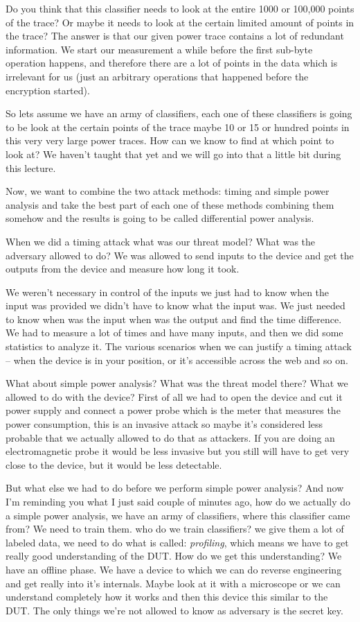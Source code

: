 Do you think that this classifier needs to look at the entire 1000 or 100,000
points of the trace? Or maybe it needs to look at the certain limited amount of
points in the trace? The answer is that our given power trace contains a lot of
redundant information. We start our measurement a while before the first
sub-byte operation happens, and therefore there are a lot of points in the data
which is irrelevant for us (just an arbitrary operations that happened before
the encryption started).

So lets assume we have an army of classifiers, each one of these classifiers is
going to be look at the certain points of the trace maybe 10 or 15 or hundred
points in this very very large power traces. How can we know to find at which
point to look at? We haven't taught that yet and we will go into that a little
bit during this lecture. 
 
Now, we want to combine the two attack methods: timing and simple power analysis
and take the best part of each one of these methods combining them somehow and
the results is going to be called differential power analysis.
 
When we did a timing attack what was our threat model? What was the adversary
allowed to do? We was allowed to send inputs to the device and get the outputs
from the device and measure how long it took.
 
We weren't necessary in control of the inputs we just had to know when the input
was provided we didn't have to know what the input was. We just needed to know
when was the input when was the output and find the time difference. We had to
measure a lot of times and have many inputs, and then we did some statistics to
analyze it. The various scenarios when we can justify a timing attack – when the
device is in your position, or it's accessible across the web and so on.

What about simple power analysis? What was the threat model there? What we
allowed to do with the device? First of all we had to open the device and cut it
power supply and connect a power probe which is the meter that measures the
power consumption, this is an invasive attack so maybe it's considered less
probable that we actually allowed to do that as attackers. If you are doing an
electromagnetic probe it would be less invasive but you still will have to get
very close to the device, but it would be less detectable. 

But what else we had to do before we perform simple power analysis? And now I'm
reminding you what I just said couple of minutes ago, how do we actually do a
simple power analysis, we have an army of classifiers, where this classifier
came from? We need to train them. who do we train classifiers? we give them a
lot of labeled data, we need to do what is called: \textit{profiling}, which
means we have to get really good understanding of the DUT. How do we get this
understanding? We have an offline phase. We have a device to which we can do
reverse engineering and get really into it's internals. Maybe look at it with a
microscope or we can understand completely how it works and then this device
this similar to the DUT. The only things we're not allowed to know as adversary
is the secret key.

